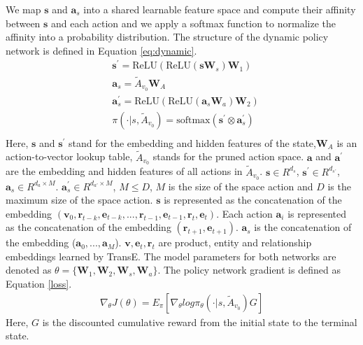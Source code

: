 \documentclass[review]{elsarticle}
\begin{document}
\begin{sloppypar}
We map $\mathbf s$ and $\mathbf a_{s}$ into a shared learnable feature space and compute their affinity between $\mathbf s$ and each action and we apply a softmax function to normalize the affinity into a probability distribution. The structure of the dynamic policy network is defined in Equation \ref{eq:dynamic}.
\begin{equation}
\label{eq:dynamic}
    \begin{aligned}
    &\mathbf s^{'}=\text{ReLU}(\text{ReLU}(\mathbf s \mathbf W_{s})\mathbf W_{1}) \\
    &\mathbf a_{s}=\tilde{A}_{v_{0}}\mathbf W_{A} \\
    &\mathbf a^{'}_{s}=\text{ReLU}(\text{ReLU}(\mathbf a_{s}\mathbf W_{a})\mathbf W_{2}) \\
    &\pi(\cdot|s,\tilde{A}_{v_{0}})=\text{softmax}(\mathbf s^{'} \otimes \mathbf a^{'}_{s})\\
    \end{aligned}
\end{equation}
Here, $\mathbf s$ and $\mathbf s^{'}$ stand for the embedding and hidden features of the state,$\mathbf W_{A}$ is an action-to-vector lookup table, $\tilde{A}_{v_{0}}$ stands for the pruned action space.
$\mathbf a$ and $\mathbf a^{'}$ are the embedding and hidden features of all actions in $\tilde{A}_{v_{0}}$.
$\mathbf s \in R^{d_{s}}$, $\mathbf s^{'}\in R^{d_{s’}}$, $\mathbf a_{s} \in R^{d_{a} \times M}$. $\mathbf a^{'}_{s} \in R^{d_{a’} \times M}$, $M \leq D$, $M$ is the size of the space action and $D$ is the maximum size of the space action.
$\mathbf s$ is represented as the concatenation of the embedding $(\mathbf v_{0},\mathbf r_{t-k},\mathbf e_{t-k},...,\mathbf r_{t-1},\mathbf e_{t-1},\mathbf r_{t},\mathbf e_{t})$.
Each action $\mathbf a_{i}$ is represented as the concatenation of the embedding $(\mathbf r_{t+1},\mathbf e_{t+1})$. 
$\mathbf a_{s}$ is the concatenation of the embedding ($\mathbf a_{0},..., \mathbf a_{M}$).
$\mathbf v,\mathbf e_{t},\mathbf r_{t}$ are product, entity and relationship embeddings learned by TransE.
The model parameters for both networks are denoted as $\theta=\{\mathbf W_{1},\mathbf W_{2},\mathbf W_{s},\mathbf W_{a}\}$. The policy network gradient  is defined as Equation \ref{loss}.
\begin{equation}
\label{loss}
\begin{aligned}
\nabla_{\theta}J(\theta)=E_{\pi}[{\nabla_{\theta}}log \pi_{\theta}(\cdot|s,\tilde{A}_{v_{0}})G]
\end{aligned}
\end{equation}
Here, $G$ is the discounted cumulative reward from the initial state to the terminal state.

\end{sloppypar}
\end{document}
